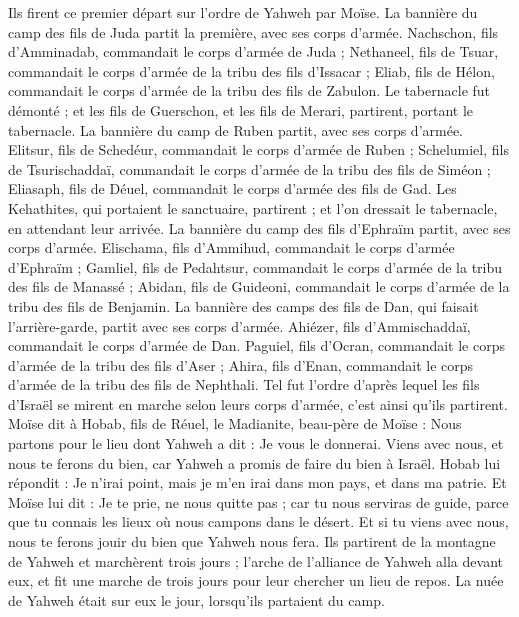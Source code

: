 \begin{multicols}{2}
Ils firent ce premier départ sur l’ordre de Yahweh par Moïse.
La bannière du camp des fils de Juda partit la première, avec ses corps d’armée. Nachschon, fils d’Amminadab, commandait le corps d’armée de Juda ;
Nethaneel, fils de Tsuar, commandait le corps d’armée de la tribu des fils d'Issacar ;
Eliab, fils de Hélon, commandait le corps d’armée de la tribu des fils de Zabulon.
Le tabernacle fut démonté ; et les fils de Guerschon, et les fils de Merari, partirent, portant le tabernacle.
La bannière du camp de Ruben partit, avec ses corps d’armée. Elitsur, fils de Schedéur, commandait le corps d’armée de Ruben ;
Schelumiel, fils de Tsurischaddaï, commandait le corps d’armée de la tribu des fils de Siméon ;
Eliasaph, fils de Déuel, commandait le corps d’armée des fils de Gad.
Les Kehathites, qui portaient le sanctuaire, partirent ; et l’on dressait le tabernacle, en attendant leur arrivée.
La bannière du camp des fils d'Ephraïm partit, avec ses corps d’armée. Elischama, fils d’Ammihud, commandait le corps d’armée d'Ephraïm ;
Gamliel, fils de Pedahtsur, commandait le corps d’armée de la tribu des fils de Manassé ;
Abidan, fils de Guideoni, commandait le corps d’armée de la tribu des fils de Benjamin.
La bannière des camps des fils de Dan, qui faisait l'arrière-garde, partit avec ses corps d’armée. Ahiézer, fils d’Ammischaddaï, commandait le corps d’armée de Dan.
Paguiel, fils d’Ocran, commandait le corps d’armée de la tribu des fils d'Aser ;
Ahira, fils d’Enan, commandait le corps d’armée de la tribu des fils de Nephthali.
Tel fut l’ordre d’après lequel les fils d'Israël se mirent en marche selon leurs corps d’armée, c’est ainsi qu’ils partirent.
Moïse dit à Hobab, fils de Réuel, le Madianite, beau-père de Moïse : Nous partons pour le lieu dont Yahweh a dit : Je vous le donnerai. Viens avec nous, et nous te ferons du bien, car Yahweh a promis de faire du bien à Israël.
Hobab lui répondit : Je n’irai point, mais je m'en irai dans mon pays, et dans ma patrie.
Et Moïse lui dit : Je te prie, ne nous quitte pas ; car tu nous serviras de guide, parce que tu connais les lieux où nous campons dans le désert.
Et si tu viens avec nous, nous te ferons jouir du bien que Yahweh nous fera.
Ils partirent de la montagne de Yahweh et marchèrent trois jours ; l'arche de l'alliance de Yahweh alla devant eux, et fit une marche de trois jours pour leur chercher un lieu de repos.
La nuée de Yahweh était sur eux le jour, lorsqu’ils partaient du camp.

\end{multicols}
